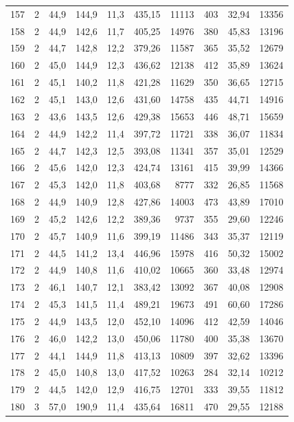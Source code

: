\documentclass[11pt,a4paper]{article}
\begin{document}
{\begin{longtable}{r c r r r r r r r r}
157 & 2 & 44,9 & 144,9 & 11,3 & 435,15 & 11113 & 403 & 32,94 & 13356 \\
158 & 2 & 44,9 & 142,6 & 11,7 & 405,25 & 14976 & 380 & 45,83 & 13196 \\
159 & 2 & 44,7 & 142,8 & 12,2 & 379,26 & 11587 & 365 & 35,52 & 12679 \\
160 & 2 & 45,0 & 144,9 & 12,3 & 436,62 & 12138 & 412 & 35,89 & 13624 \\
161 & 2 & 45,1 & 140,2 & 11,8 & 421,28 & 11629 & 350 & 36,65 & 12715 \\
162 & 2 & 45,1 & 143,0 & 12,6 & 431,60 & 14758 & 435 & 44,71 & 14916 \\
163 & 2 & 43,6 & 143,5 & 12,6 & 429,38 & 15653 & 446 & 48,71 & 15659 \\
164 & 2 & 44,9 & 142,2 & 11,4 & 397,72 & 11721 & 338 & 36,07 & 11834 \\
165 & 2 & 44,7 & 142,3 & 12,5 & 393,08 & 11341 & 357 & 35,01 & 12529 \\
166 & 2 & 45,6 & 142,0 & 12,3 & 424,74 & 13161 & 415 & 39,99 & 14366 \\
167 & 2 & 45,3 & 142,0 & 11,8 & 403,68 & 8777 & 332 & 26,85 & 11568 \\
168 & 2 & 44,9 & 140,9 & 12,8 & 427,86 & 14003 & 473 & 43,89 & 17010 \\
169 & 2 & 45,2 & 142,6 & 12,2 & 389,36 & 9737 & 355 & 29,60 & 12246 \\
170 & 2 & 45,7 & 140,9 & 11,6 & 399,19 & 11486 & 343 & 35,37 & 12119 \\
171 & 2 & 44,5 & 141,2 & 13,4 & 446,96 & 15978 & 416 & 50,32 & 15002 \\
172 & 2 & 44,9 & 140,8 & 11,6 & 410,02 & 10665 & 360 & 33,48 & 12974 \\
173 & 2 & 46,1 & 140,7 & 12,1 & 383,42 & 13092 & 367 & 40,08 & 12908 \\
174 & 2 & 45,3 & 141,5 & 11,4 & 489,21 & 19673 & 491 & 60,60 & 17286 \\
175 & 2 & 44,9 & 143,5 & 12,0 & 452,10 & 14096 & 412 & 42,59 & 14046 \\
176 & 2 & 46,0 & 142,2 & 13,0 & 450,06 & 11780 & 400 & 35,38 & 13670 \\
177 & 2 & 44,1 & 144,9 & 11,8 & 413,13 & 10809 & 397 & 32,62 & 13396 \\
178 & 2 & 45,0 & 140,8 & 13,0 & 417,52 & 10263 & 284 & 32,14 & 10212 \\
179 & 2 & 44,5 & 142,0 & 12,9 & 416,75 & 12701 & 333 & 39,55 & 11812 \\
180 & 3 & 57,0 & 190,9 & 11,4 & 435,64 & 16811 & 470 & 29,55 & 12188 \\

\end{longtable}}
\end{document}

